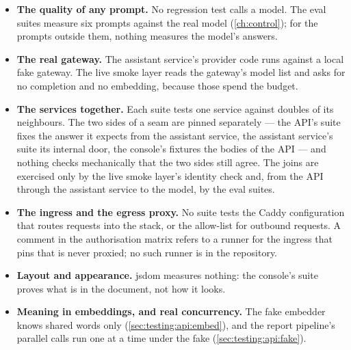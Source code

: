 \begin{itemize}
  \item \textbf{The quality of any prompt.} No regression test calls a model. The eval suites
        measure six prompts against the real model (\cref{ch:control}); for the prompts
        outside them, nothing measures the model's answers.
  \item \textbf{The real gateway.} The assistant service's provider code runs against a local
        fake gateway. The live smoke layer reads the gateway's model list and asks for no
        completion and no embedding, because those spend the budget.
  \item \textbf{The services together.} Each suite tests one service against doubles of its
        neighbours. The two sides of a seam are pinned separately --- the API's suite fixes
        the answer it expects from the assistant service, the assistant service's suite its
        internal door, the console's fixtures the bodies of the API --- and nothing checks
        mechanically that the two sides still agree. The joins are exercised only by the
        live smoke layer's identity check and, from the API
        through the assistant service to the model, by the eval suites.
  \item \textbf{The ingress and the egress proxy.} No suite tests the Caddy configuration that
        routes requests into the stack, or the allow-list for outbound requests. A comment in
        the authorisation matrix refers to a runner for the ingress that pins that
         is never proxied; no such runner is in the repository.
  \item \textbf{Layout and appearance.} jsdom measures nothing: the console's suite proves
        what is in the document, not how it looks.
  \item \textbf{Meaning in embeddings, and real concurrency.} The fake embedder knows shared
        words only (\cref{sec:testing:api:embed}), and the report pipeline's parallel calls
        run one at a time under the fake (\cref{sec:testing:api:fake}).
\end{itemize}
